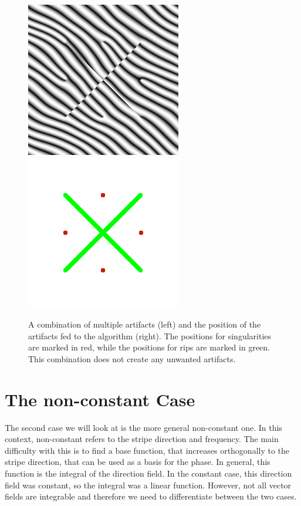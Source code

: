 \documentclass{utue} %
\begin{document}
\begin{figure}[ht]
  \centering
  \includegraphics[width=0.49\linewidth]{images/combiningArtifacts}
  \includegraphics[width=0.49\linewidth]{images/combiningArtifactsPositions}
  \caption{A combination of multiple artifacts (left) and the position of the artifacts fed to the algorithm (right). The positions for singularities are marked in red, while the positions for rips are marked in green. This combination does not create any unwanted artifacts.}\label{fig:combiningArtifacts}
\end{figure}



\section{The non-constant Case}\label{sec:nonConstant}
The second case we will look at is the more general non-constant one. In this context, non-constant refers to the stripe direction and frequency. The main difficulty with this is to find a base function, that increases orthogonally to the stripe direction, that can be used as a basis for the phase. In general, this function is the integral of the direction field. In the constant case, this direction field was constant, so the integral was a linear function. However, not all vector fields are integrable and therefore we need to differentiate between the two cases.
\end{document}
